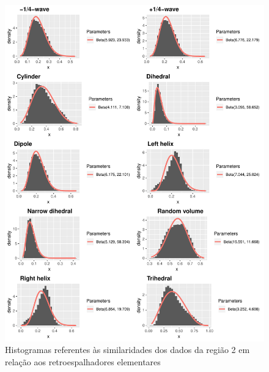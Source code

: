 \documentclass[12pt]{article}
\begin{document}
\begin{figure}[!h]
  \vspace{0.1\linewidth}
  \centering
  \includegraphics[width = 0.8\linewidth]{../../Figures/Report_19_02_27/region2_plots.pdf}
  \caption{Histogramas referentes às similaridades dos dados da região 2 em relação aos retroespalhadores elementares}
  \label{fig:hists2}

\end{figure}

\newpage
\end{document}
